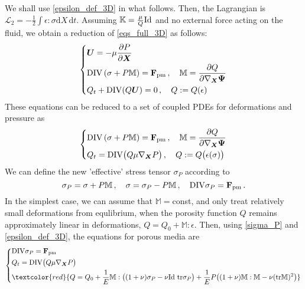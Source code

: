\documentclass[12pt]{article}
\numberwithin{theorem}{section}
\newcommand{\bX}{\boldsymbol{X}}
\newcommand{\bpsi}{\boldsymbol{\Psi}}
\newcommand{\bU}{\boldsymbol{U}}
\newcommand{\pp}[2]{\frac{\partial #1}{\partial #2}}
\newcommand{\CL}{{\mathcal L}}
\begin{document}
We shall use \eqref{epsilon_def_3D} in what follows. 
Then, the Lagrangian is $\CL_2 = -\frac{1}{2} \int \epsilon : \sigma \mbox{d} X \, \mbox{d} t $. Assuming $\mathbb{K} = \frac{\mu} Q  {\rm Id}$ and no external force acting on the fluid, we obtain a reduction of  \eqref{eqs_full_3D} as follows:  
\begin{equation} 
\left\{ 
\begin{aligned} 
& 
 \bU  =- \mu \pp{P}{\bX}  \\ 
&  {\rm DIV} \left( \sigma + P \mathbb{M} \right)  
= \mathbf{F}_{\rm pm} \, , \quad \mathbb{M} =  \pp{Q}{ \nabla_{\bX}  \bpsi} 
\\ 
& Q_t +{\rm DIV} (Q \bU) =0\, , 
\quad Q:= Q(\epsilon) 
\end{aligned}  
\right. 
\label{eqs_full_3D_simple} 
\end{equation} 
These equations can be reduced to a set of coupled PDEs for deformations and pressure as 
\begin{equation} 
\left\{ 
\begin{aligned} 
& 
  {\rm DIV} \left( \sigma + P \mathbb{M} \right)  
= \mathbf{F}_{\rm pm} \, , \quad \mathbb{M} =  \pp{Q}{ \nabla_{\bX}  \bpsi} 
\\ 
& Q_t ={\rm DIV} \big(Q \mu \nabla_{\bX} P \big)  \, , 
\quad Q:= Q\big(\epsilon(\sigma) \big) 
\end{aligned}  
\right. 
\label{eqs_full_3D_simple2} 
\end{equation} 
We can define the new 'effective' stress tensor  $\sigma_P$ according to 
\begin{equation} 
\label{sigma_P} 
\sigma_P=\sigma + P \mathbb{M}\, ,  \quad \sigma = \sigma_P - P \mathbb{M} \,, \quad {\rm DIV} \sigma_P=\mathbf{F}_{\rm pm}  
\, . 
\end{equation} 
In the simplest case, we can assume that $\mathbb{M}=$const, and only treat relatively small deformations from equlibrium, when the porosity function $Q$ remains approximately linear in deformations, $Q=Q_0 +\mathbb{M} : \epsilon$. Then, using \eqref{sigma_P} and \eqref{epsilon_def_3D}, the equations for porous media are 
\begin{equation} 
\left\{ 
\begin{aligned} 
& 
  {\rm DIV} \sigma_P 
= \mathbf{F}_{\rm pm}  \\ 
& Q_t ={\rm DIV} \big(Q \mu \nabla_{\bX} P \big)  
\\ 
& \textcolor{red}{Q= Q_0 + \frac{1}{E} \mathbb{M} : \big( (1+\nu)\sigma_P - \nu {\rm Id} \ {\rm tr} \sigma_P \big) + 
\frac{1}{E} P \big( (1+\nu)\mathbb{M}: \mathbb{M} -  \nu   ({\rm tr} \mathbb{M})^2  \big) 
}
\end{aligned}  
\right. 
\label{eqs_full_3D_simple3} 
\end{equation} 
\end{document}
